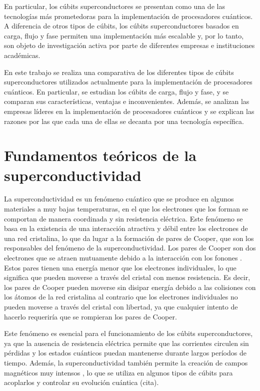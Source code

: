 \documentclass[12pt]{article}
\begin{document}
En particular, los cúbits superconductores se presentan como una de las tecnologías más prometedoras para la implementación de procesadores cuánticos. A diferencia de otros tipos de cúbits, los cúbits superconductores basados en carga, flujo y fase permiten una implementación más escalable y, por lo tanto, son objeto de investigación activa por parte de diferentes empresas e instituciones académicas.

En este trabajo se realiza una comparativa de los diferentes tipos de cúbits superconductores utilizados actualmente para la implementación de procesadores cuánticos. En particular, se estudian los cúbits de carga, flujo y fase, y se comparan sus características, ventajas e inconvenientes. Además, se analizan las empresas líderes en la implementación de procesadores cuánticos y se explican las razones por las que cada una de ellas se decanta por una tecnología específica.

\section{Fundamentos teóricos de la superconductividad}

La superconductividad es un fenómeno cuántico que se produce en algunos materiales a muy bajas temperaturas, en el que los electrones que los forman se comportan de manera coordinada y sin resistencia eléctrica. Este fenómeno se basa en la existencia de una interacción atractiva y débil \cite{bardeen_theory_1957} entre los electrones de una red cristalina, lo que da lugar a la formación de pares de Cooper, que son los responsables del fenómeno de la superconductividad. Los pares de Cooper son dos electrones que se atraen mutuamente debido a la interacción con los fonones \cite{ferrell_knight_1959}. Estos pares tienen una energía menor que los electrones individuales, lo que significa que pueden moverse a través del cristal con menos resistencia. Es decir, los pares de Cooper pueden moverse sin disipar energía debido a las colisiones con los átomos de la red cristalina \cite{bardeen_microscopic_1957} al contrario que los electrones individuales no pueden moverse a través del cristal con libertad, ya que cualquier intento de hacerlo requeriría que se rompieran los pares de Cooper.

Este fenómeno es esencial para el funcionamiento de los cúbits superconductores, ya que la ausencia de resistencia eléctrica permite que las corrientes circulen sin pérdidas y los estados cuánticos puedan mantenerse durante largos períodos de tiempo. Además, la superconductividad también permite la creación de campos magnéticos muy intensos \cite{tyler_measurements_2004}, lo que se utiliza en algunos tipos de cúbits para acoplarlos y controlar su evolución cuántica (cita).
\end{document}
